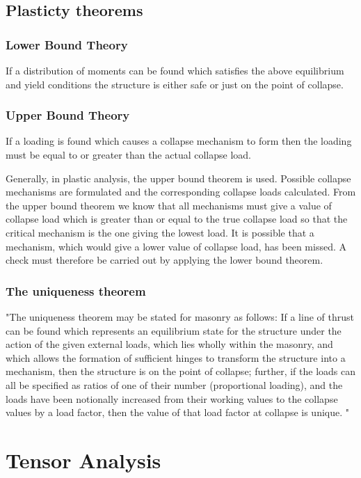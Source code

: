 \subsection{Plasticty theorems}
\subsubsection{Lower Bound Theory}


If a distribution of moments can be found which satisfies the above equilibrium and yield conditions the structure is either safe or just on the point of collapse.
\subsubsection{Upper Bound Theory}


If a loading is found which causes a collapse mechanism to form then the loading must be equal to or greater than the actual collapse load.

Generally, in plastic analysis, the upper bound theorem is used. Possible collapse mechanisms are formulated and the corresponding collapse loads calculated. From the upper bound theorem we know that all mechanisms must give a value of collapse load which is greater than or equal to the true collapse load so that the critical mechanism is the one giving the lowest load. It is possible that a mechanism, which would give a lower value of collapse load, has been missed. A check must therefore be carried out by applying the lower bound theorem.


\subsubsection{The uniqueness theorem}
"The uniqueness theorem may be stated for masonry as follows: If a line of thrust can be found which represents an equilibrium state for the structure under the action of the given external loads, which lies wholly within the masonry, and which allows the formation of sufficient hinges to transform the structure into a mechanism, then the structure is on the point of collapse; further, if the loads can all be specified as ratios of one of their number (proportional loading), and the loads have been notionally increased from their working values to the collapse values by a load factor, then the value of that load factor at collapse is unique. "


\section{Tensor Analysis}

